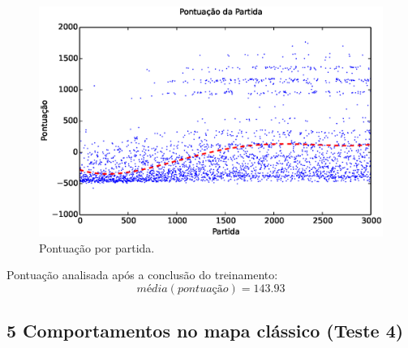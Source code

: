 \documentclass{beamer}
\begin{document}

\begin{frame}
\begin{figure}[h]
    \centering
    \includegraphics[width=0.7\linewidth]{images/5_behaviors_small_map/match_scores____pol}
    \caption{Pontuação por partida.}
    \label{img:5ComportamentosMapaPequeno:PontuacaoPorPartida}
\end{figure}

Pontuação analisada após a conclusão do treinamento:
$$ \textit{média} \left( \textit{pontuação} \right) = 143.93 $$
\end{frame}


\subsection{5 Comportamentos no mapa clássico (Teste 4)}
\end{document}
